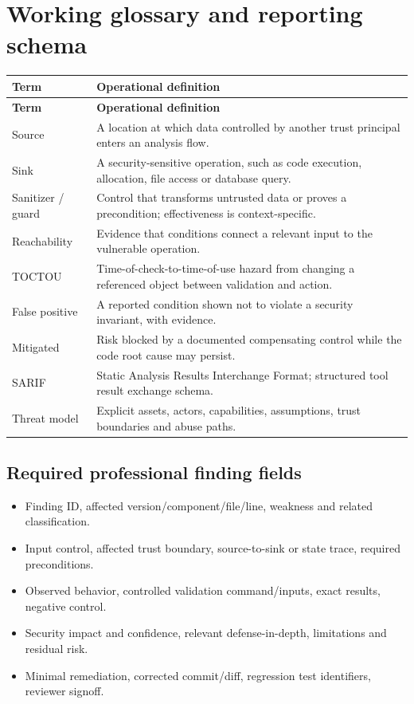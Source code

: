 \documentclass[10pt,letterpaper]{article}
\begin{document}
\section{Working glossary and reporting schema}
\begingroup\footnotesize\setlength\tabcolsep{3pt}
\begin{longtable}{>{\raggedright\arraybackslash}p{}>{\raggedright\arraybackslash}p{}}\toprule
\textbf{Term} & \textbf{Operational definition}\\\midrule\endfirsthead
\toprule \textbf{Term} & \textbf{Operational definition}\\\midrule\endhead
Source & A location at which data controlled by another trust principal enters an analysis flow.\\\midrule
Sink & A security-sensitive operation, such as code execution, allocation, file access or database query.\\\midrule
Sanitizer / guard & Control that transforms untrusted data or proves a precondition; effectiveness is context-specific.\\\midrule
Reachability & Evidence that conditions connect a relevant input to the vulnerable operation.\\\midrule
TOCTOU & Time-of-check-to-time-of-use hazard from changing a referenced object between validation and action.\\\midrule
False positive & A reported condition shown not to violate a security invariant, with evidence.\\\midrule
Mitigated & Risk blocked by a documented compensating control while the code root cause may persist.\\\midrule
SARIF & Static Analysis Results Interchange Format; structured tool result exchange schema.\\\midrule
Threat model & Explicit assets, actors, capabilities, assumptions, trust boundaries and abuse paths.\\\midrule
\bottomrule\end{longtable}\endgroup
\subsection{Required professional finding fields}
\begin{itemize}[leftmargin=*,itemsep=2pt]
\item Finding ID, affected version/component/file/line, weakness and related classification.
\item Input control, affected trust boundary, source-to-sink or state trace, required preconditions.
\item Observed behavior, controlled validation command/inputs, exact results, negative control.
\item Security impact and confidence, relevant defense-in-depth, limitations and residual risk.
\item Minimal remediation, corrected commit/diff, regression test identifiers, reviewer signoff.
\end{itemize}
\end{document}
